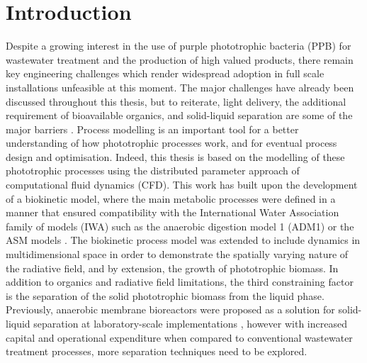 \section{Introduction}
Despite a growing interest in the use of purple phototrophic bacteria (PPB) for wastewater treatment and the production of high valued products, there remain key engineering challenges which render widespread adoption in full scale installations unfeasible at this moment.
The major challenges have already been discussed throughout this thesis, but to reiterate, light delivery, the additional requirement of bioavailable organics, and solid-liquid separation are some of the major barriers \cite{hulsen2016}. 
Process modelling is an important tool for a better understanding of how phototrophic processes work, and for eventual process design and optimisation. 
Indeed, this thesis is based on the modelling of these phototrophic processes using the distributed parameter approach of computational fluid dynamics (CFD). 
This work has built upon the development of a biokinetic model, where the main metabolic processes were defined in a manner that ensured compatibility with the International Water Association family of models (IWA) such as the anaerobic digestion model 1 (ADM1) \cite{batstone2002} or the ASM models \cite{henze2000}. 
The biokinetic process model was extended to include dynamics in multidimensional space in order to demonstrate the spatially varying nature of the radiative field, and by extension, the growth of phototrophic biomass. 
In addition to organics and radiative field limitations, the third constraining factor is the separation of the solid phototrophic biomass from the liquid phase. 
Previously, anaerobic membrane bioreactors were proposed as a solution for solid-liquid separation at laboratory-scale implementations \cite{hulsen2016}, however with increased capital and operational expenditure when compared to conventional wastewater treatment processes, more separation techniques need to be explored. 
